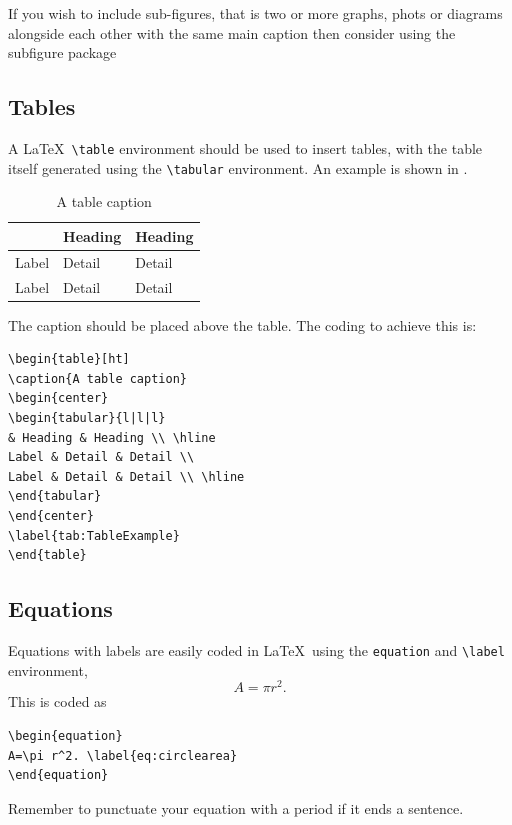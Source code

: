 \documentclass[12pt,oneside]{book} %
\begin{document}
If you wish to include sub-figures, that is two or more graphs, phots or diagrams alongside each other with the same main caption then consider using the subfigure package~\cite{bidi-tex_github_organisation_ctan_2005}

\subsection{Tables}
A \LaTeX\ \verb#\table# environment should be used to insert tables, with the table itself generated using the \verb#\tabular# environment.  An example is shown in .
\begin{table}[ht]
\caption{A table caption}
\begin{center}
\begin{tabular}{l|l|l}
& Heading & Heading \\ \hline
Label & Detail & Detail \\
Label & Detail & Detail \\ \hline
\end{tabular}
\end{center}
\label{tab:TableExample}
\end{table}
The caption should be placed above the table. The coding to achieve this is:
\begin{verbatim}
\begin{table}[ht]
\caption{A table caption}
\begin{center}
\begin{tabular}{l|l|l}
& Heading & Heading \\ \hline
Label & Detail & Detail \\
Label & Detail & Detail \\ \hline
\end{tabular}
\end{center}
\label{tab:TableExample}
\end{table}
\end{verbatim}

\subsection{Equations}
Equations with labels are easily coded in \LaTeX\ using the \verb#equation# and  \verb#\label# environment,
\begin{equation}
A=\pi r^2. \label{eq:circlearea}
\end{equation}
This is coded as
\begin{verbatim}
\begin{equation}
A=\pi r^2. \label{eq:circlearea}
\end{equation}
\end{verbatim}
Remember to punctuate your equation with a period if it ends a sentence. 
\end{document}
